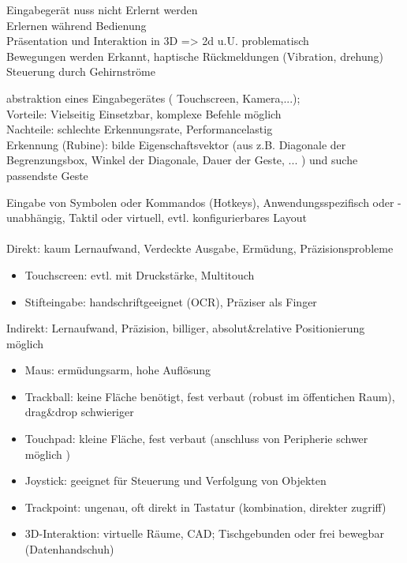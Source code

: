 

 Eingabegerät nuss nicht Erlernt werden\\
 Erlernen während Bedienung\\
 Präsentation und Interaktion in 3D => 2d u.U. problematisch\\
 Bewegungen werden Erkannt, haptische Rückmeldungen (Vibration, drehung)\\
 Steuerung durch Gehirnströme

 abstraktion eines Eingabegerätes ( Touchscreen, Kamera,...); \\
Vorteile: Vielseitig Einsetzbar, komplexe Befehle möglich \\
Nachteile: schlechte Erkennungsrate, Performancelastig\\
Erkennung (Rubine): bilde Eigenschaftsvektor (aus z.B. Diagonale der Begrenzungsbox, Winkel der Diagonale, Dauer der Geste, ... ) und suche passendste Geste

 Eingabe von Symbolen oder Kommandos (Hotkeys), Anwendungsspezifisch oder -unabhängig, Taktil oder virtuell, evtl. konfigurierbares Layout\\ 
 \\
Direkt: kaum Lernaufwand, Verdeckte Ausgabe, Ermüdung, Präzisionsprobleme 
\begin{minipage}{0.5\textwidth}
\begin{itemize}
\item Touchscreen: evtl. mit Druckstärke, Multitouch
\item Stifteingabe: handschriftgeeignet (OCR), Präziser als Finger
\end{itemize}
\end{minipage}


Indirekt: Lernaufwand, Präzision, billiger, absolut\&relative Positionierung möglich 
\begin{minipage}{0.5\textwidth}
\begin{itemize}
\item Maus: ermüdungsarm, hohe Auflösung
\item Trackball: keine Fläche benötigt, fest verbaut (robust im öffentichen Raum), drag\&drop schwieriger
\item Touchpad: kleine Fläche, fest verbaut (anschluss von Peripherie schwer möglich ) %
\item Joystick: geeignet für Steuerung und Verfolgung von Objekten
\item Trackpoint: ungenau, oft direkt in Tastatur (kombination, direkter zugriff)
\item 3D-Interaktion: virtuelle Räume, CAD; Tischgebunden oder frei bewegbar (Datenhandschuh)
\end{itemize}
\end{minipage}


